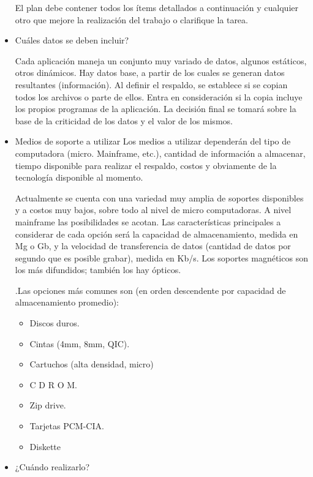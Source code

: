 \documentclass[a4paper,openright,12pt]{book}
\begin{document}
\begin{itemize}
El plan debe contener todos los ítems detallados a continuación y cualquier otro que mejore la realización del trabajo o clarifique la tarea. 

\item Cuáles datos se deben incluir? 
 
Cada aplicación maneja un conjunto muy variado de datos, algunos estáticos, otros dinámicos. Hay datos base, a partir de los cuales se generan datos resultantes (información). Al definir el respaldo, se establece si se copian todos los archivos o parte de ellos. Entra en consideración si la copia incluye los propios programas de la aplicación. La decisión final se tomará sobre la base de la criticidad de los datos y el valor de los mismos.  

\item Medios de soporte a utilizar 
 Los medios a utilizar dependerán del tipo de computadora (micro. Mainframe, etc.), cantidad de información a almacenar, tiempo disponible para realizar el respaldo, costos y obviamente de la tecnología disponible al momento. 
 
Actualmente se cuenta con una variedad muy amplia de soportes disponibles y a costos muy bajos, sobre todo al nivel de micro computadoras. A nivel mainframe las posibilidades se acotan. Las características principales a considerar de cada opción será la capacidad de almacenamiento, medida en Mg o Gb, y la velocidad de transferencia de datos (cantidad de datos por segundo que es posible grabar), medida en Kb/s. Los soportes magnéticos son los más difundidos; también los hay ópticos.  

.Las opciones más comunes son (en orden descendente por capacidad de almacenamiento promedio):  
\begin{itemize}




\item Discos duros.
\item Cintas (4mm, 8mm, QIC).
\item Cartuchos (alta densidad, micro)
\item C D R O M.
\item Zip drive.
\item Tarjetas PCM-CIA.
\item Diskette  
\end{itemize}
\item ¿Cuándo realizarlo? 


\end{itemize}
\end{document}
